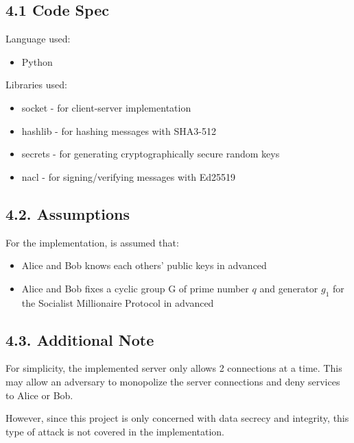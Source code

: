 \documentclass{article}
\begin{document}
\subsection*{4.1 Code Spec}

Language used: 
\begin{itemize}
  \item Python
\end{itemize}

Libraries used: 
\begin{itemize}
  \item socket - for client-server implementation
  \item hashlib - for hashing messages with SHA3-512
  \item secrets - for generating cryptographically secure random keys 
  \item nacl - for signing/verifying messages with Ed25519
\end{itemize}

\subsection*{4.2. Assumptions}

For the implementation, is assumed that:

\begin{itemize}
  \item Alice and Bob knows each others' public keys in advanced
  \item Alice and Bob fixes a cyclic group G of prime number $q$ and generator $g_1$ 
  for the Socialist Millionaire Protocol in advanced
\end{itemize}

\subsection*{4.3. Additional Note}

For simplicity, the implemented server only allows 2 connections at a time. 
This may allow an adversary to monopolize the server connections and deny 
services to Alice or Bob. 

However, since this project is only concerned with 
data secrecy and integrity, this type of attack is not covered in the 
implementation.
\end{document}

